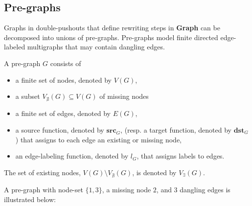 \subsection{Pre-graphs}
Graphs in double-pushouts that define rewriting steps in \textbf{Graph} can be decomposed into unions of pre-graphs. Pre-graphs model finite directed edge-labeled multigraphs that may contain dangling edges.
\begin{definition}
    \label{def:pre-graph}
    A pre-graph $G$ consists of
    \begin{itemize}
        \item a finite set of nodes, denoted by $V(G)$,
        \item a subset $V_{\nexists}(G) \subseteq V(G)$ of missing nodes
        \item a finite set of edges, denoted by $E(G)$,
        \item a source function, denoted by \( \textbf{src}_G \), (resp. a target function, denoted by \( \textbf{dst}_G \)) that assigns to each edge an existing or missing node,
        \item an edge-labeling function, denoted by $l_G$, that assigns labels to edges.
    \end{itemize}
\end{definition} 
The set of existing nodes, $V(G) \setminus V_{\nexists}(G)$, is denoted by $V_\exists(G)$.

 \begin{example}
    \label{def:pregraph}
     A pre-graph with node-set $\{1,3\}$, a missing node $2$, and 3 dangling edges is illustrated below:
     \begin{center}
    \end{center}
 \end{example}
 
